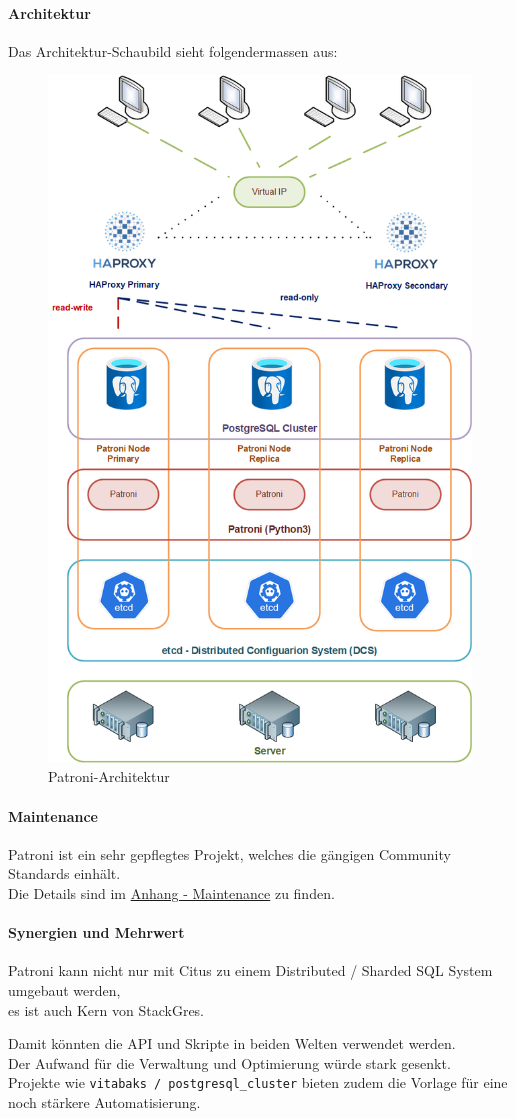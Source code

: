 \begin{flushleft}
    \paragraph{Architektur}
    Das Architektur-Schaubild sieht folgendermassen aus:
    \begin{figure}[H]
        \centering
        \includegraphics[width=0.6\linewidth]{source/implementation/evaluation/postgresql_ha_solutions/patroni_architecture}
        \caption{Patroni-Architektur}
        \label{fig:patroni-architecture}
    \end{figure}
\end{flushleft}
\begin{flushleft}
    \paragraph{Maintenance}
    Patroni ist ein sehr gepflegtes Projekt, welches die gängigen Community Standards einhält.\\
    Die Details sind im \hyperref[subsec:maintenance_patroni]{Anhang - Maintenance} zu finden.
\end{flushleft}
\begin{flushleft}
    \paragraph{Synergien und Mehrwert}
    Patroni kann nicht nur mit Citus zu einem Distributed / Sharded SQL System umgebaut werden,\\
    es ist auch Kern von StackGres.
\end{flushleft}
\begin{flushleft}
    Damit könnten die API und Skripte in beiden Welten verwendet werden.\\
    Der Aufwand für die Verwaltung und Optimierung würde stark gesenkt.\\
    Projekte wie \texttt{vitabaks / postgresql\_cluster}\cite{HIQVBEPF} bieten zudem die Vorlage für eine noch stärkere Automatisierung.
\end{flushleft}